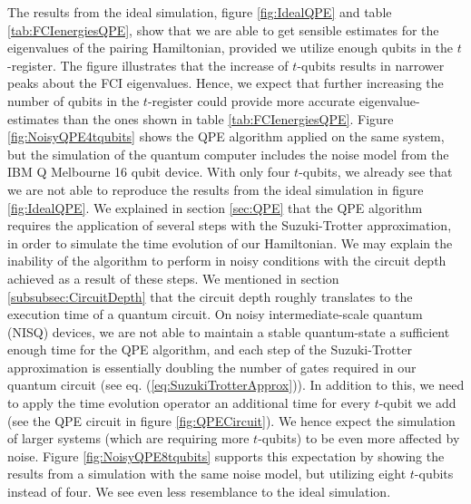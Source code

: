 The results from the ideal simulation, figure \ref{fig:IdealQPE} and table \ref{tab:FCIenergiesQPE}, show that we are able to get sensible estimates for the eigenvalues of the pairing Hamiltonian, provided we utilize enough qubits in the $t$-register. The figure illustrates that the increase of $t$-qubits results in narrower peaks about the FCI eigenvalues. Hence, we expect that further increasing the number of qubits in the $t$-register could provide more accurate eigenvalue-estimates than the ones shown in table \ref{tab:FCIenergiesQPE}. Figure \ref{fig:NoisyQPE4tqubits} shows the QPE algorithm applied on the same system, but the simulation of the quantum computer includes the noise model from the IBM Q Melbourne 16 qubit device. With only four $t$-qubits, we already see that we are not able to reproduce the results from the ideal simulation in figure \ref{fig:IdealQPE}. We explained in section \ref{sec:QPE} that the QPE algorithm requires the application of several steps with the Suzuki-Trotter approximation, in order to simulate the time evolution of our Hamiltonian. We may explain the inability of the algorithm to perform in noisy conditions with the circuit depth achieved as a result of these steps. We mentioned in section \ref{subsubsec:CircuitDepth} that the circuit depth roughly translates to the execution time of a quantum circuit. On noisy intermediate-scale quantum (NISQ) devices, we are not able to maintain a stable quantum-state a sufficient enough time for the QPE algorithm, and each step of the Suzuki-Trotter approximation is essentially doubling the number of gates required in our quantum circuit (see eq. (\ref{eq:SuzukiTrotterApprox})). In addition to this, we need to apply the time evolution operator an additional time for every $t$-qubit we add (see the QPE circuit in figure \ref{fig:QPECircuit}). We hence expect the simulation of larger systems (which are requiring more $t$-qubits) to be even more affected by noise. Figure \ref{fig:NoisyQPE8tqubits} supports this expectation by showing the results from a simulation with the same noise model, but utilizing eight $t$-qubits instead of four. We see even less resemblance to the ideal simulation.

